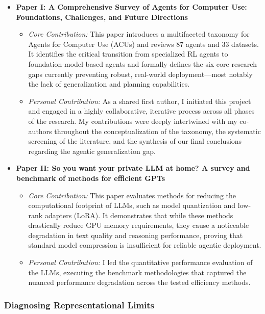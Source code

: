 \begin{itemize}
    \item \textbf{Paper I: A Comprehensive Survey of Agents for Computer Use: Foundations, Challenges, and Future Directions}
    \begin{itemize}
        \item \textit{Core Contribution:} This paper introduces a multifaceted taxonomy for Agents for Computer Use (ACUs) and reviews 87 agents and 33 datasets. It identifies the critical transition from specialized RL agents to foundation-model-based agents and formally defines the six core research gaps currently preventing robust, real-world deployment---most notably the lack of generalization and planning capabilities.
        \item \textit{Personal Contribution:} As a shared first author, I initiated this project and engaged in a highly collaborative, iterative process across all phases of the research. My contributions were deeply intertwined with my co-authors throughout the conceptualization of the taxonomy, the systematic screening of the literature, and the synthesis of our final conclusions regarding the agentic generalization gap.
    \end{itemize}

    \item \textbf{Paper II: So you want your private LLM at home? A survey and benchmark of methods for efficient GPTs}
    \begin{itemize}
        \item \textit{Core Contribution:} This paper evaluates methods for reducing the computational footprint of LLMs, such as model quantization and low-rank adapters (LoRA). It demonstrates that while these methods drastically reduce GPU memory requirements, they cause a noticeable degradation in text quality and reasoning performance, proving that standard model compression is insufficient for reliable agentic deployment.
        \item \textit{Personal Contribution:} I led the quantitative performance evaluation of the LLMs, executing the benchmark methodologies that captured the nuanced performance degradation across the tested efficiency methods.
    \end{itemize}
\end{itemize}

\subsubsection{Diagnosing Representational Limits}

